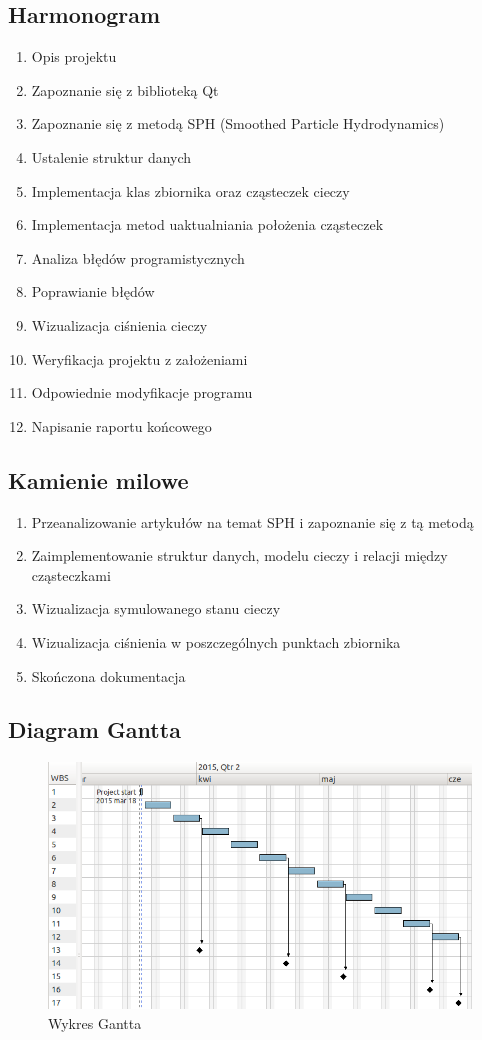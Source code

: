 \documentclass[a4paper]{article}
\begin{document}
\subsection{Harmonogram}
\begin{enumerate}[label=Z\arabic*{.}]
  \item Opis projektu
  \item Zapoznanie się z biblioteką Qt
  \item Zapoznanie się z metodą SPH (Smoothed Particle Hydrodynamics)
  \item Ustalenie struktur danych
  \item Implementacja klas zbiornika oraz cząsteczek cieczy 
  \item Implementacja metod uaktualniania położenia cząsteczek
  \item Analiza błędów programistycznych
  \item Poprawianie błędów
  \item Wizualizacja ciśnienia cieczy
  \item Weryfikacja projektu z założeniami
  \item Odpowiednie modyfikacje programu
  \item Napisanie raportu końcowego
\end{enumerate}

\subsection{Kamienie milowe}
\begin{enumerate}[label=K\arabic*{.}]
  \item Przeanalizowanie artykułów na temat SPH i zapoznanie się z tą metodą
  \item Zaimplementowanie struktur danych, modelu cieczy i relacji między cząsteczkami
  \item Wizualizacja symulowanego stanu cieczy
  \item Wizualizacja ciśnienia w poszczególnych punktach zbiornika
  \item Skończona dokumentacja
\end{enumerate}

\subsection{Diagram Gantta}
\begin{figure}[h] %
  \begin{center}  
    \includegraphics[width=\textwidth]{./rysunki/gantt.png} 
  \end{center}
  \caption{Wykres Gantta}
  \label{fig:gantt} 
\end{figure}       
\end{document}
